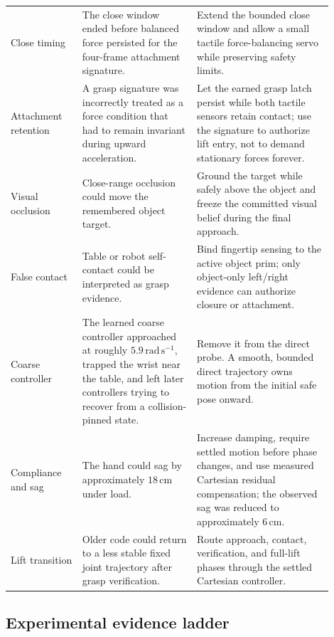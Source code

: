 \begin{longtable}{>{\raggedright\arraybackslash}p{0.20\linewidth}
                  >{\raggedright\arraybackslash}p{0.32\linewidth}
                  >{\raggedright\arraybackslash}p{0.38\linewidth}}
Close timing & The close window ended before balanced force persisted for the
four-frame attachment signature. & Extend the bounded close window and allow a
small tactile force-balancing servo while preserving safety limits. \\

Attachment retention & A grasp signature was incorrectly treated as a force
condition that had to remain invariant during upward acceleration. & Let the
earned grasp latch persist while both tactile sensors retain contact; use the
signature to authorize lift entry, not to demand stationary forces forever. \\

Visual occlusion & Close-range occlusion could move the remembered object
target. & Ground the target while safely above the object and freeze the
committed visual belief during the final approach. \\

False contact & Table or robot self-contact could be interpreted as grasp
evidence. & Bind fingertip sensing to the active object prim; only object-only
left/right evidence can authorize closure or attachment. \\

Coarse controller & The learned coarse controller approached at roughly
$5.9\,\mathrm{rad\,s^{-1}}$, trapped the wrist near the table, and left later
controllers trying to recover from a collision-pinned state. & Remove it from
the direct probe.  A smooth, bounded direct trajectory owns motion from the
initial safe pose onward. \\

Compliance and sag & The hand could sag by approximately $18\,\mathrm{cm}$
under load. & Increase damping, require settled motion before phase changes,
and use measured Cartesian residual compensation; the observed sag was reduced
to approximately $6\,\mathrm{cm}$. \\

Lift transition & Older code could return to a less stable fixed joint
trajectory after grasp verification. & Route approach, contact, verification,
and full-lift phases through the settled Cartesian controller. \\
\bottomrule
\end{longtable}

\subsection{Experimental evidence ladder}

